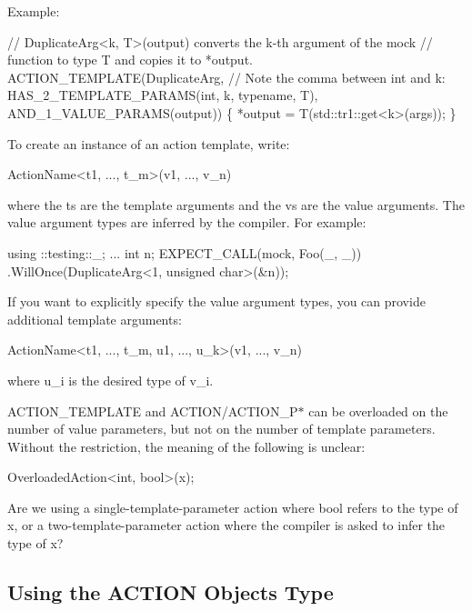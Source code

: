 Example\+: 
\begin{DoxyCode}
// DuplicateArg<k, T>(output) converts the k-th argument of the mock
// function to type T and copies it to *output.
ACTION\_TEMPLATE(DuplicateArg,
                // Note the comma between int and k:
                HAS\_2\_TEMPLATE\_PARAMS(int, k, typename, T),
                AND\_1\_VALUE\_PARAMS(output)) \{
  *output = T(std::tr1::get<k>(args));
\}
\end{DoxyCode}


To create an instance of an action template, write\+: 
\begin{DoxyCode}
ActionName<t1, ..., t\_m>(v1, ..., v\_n)
\end{DoxyCode}
 where the {\ttfamily t}s are the template arguments and the {\ttfamily v}s are the value arguments. The value argument types are inferred by the compiler. For example\+: 
\begin{DoxyCode}
using ::testing::\_;
...
  int n;
  EXPECT\_CALL(mock, Foo(\_, \_))
      .WillOnce(DuplicateArg<1, unsigned char>(&n));
\end{DoxyCode}


If you want to explicitly specify the value argument types, you can provide additional template arguments\+: 
\begin{DoxyCode}
ActionName<t1, ..., t\_m, u1, ..., u\_k>(v1, ..., v\_n)
\end{DoxyCode}
 where {\ttfamily u\+\_\+i} is the desired type of {\ttfamily v\+\_\+i}.

{\ttfamily A\+C\+T\+I\+O\+N\+\_\+\+T\+E\+M\+P\+L\+A\+TE} and {\ttfamily A\+C\+T\+I\+ON}/{\ttfamily A\+C\+T\+I\+O\+N\+\_\+\+P$\ast$} can be overloaded on the number of value parameters, but not on the number of template parameters. Without the restriction, the meaning of the following is unclear\+:


\begin{DoxyCode}
OverloadedAction<int, bool>(x);
\end{DoxyCode}


Are we using a single-\/template-\/parameter action where {\ttfamily bool} refers to the type of {\ttfamily x}, or a two-\/template-\/parameter action where the compiler is asked to infer the type of {\ttfamily x}?

\subsection*{Using the A\+C\+T\+I\+ON Object\textquotesingle{}s Type}

